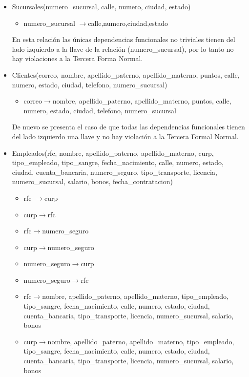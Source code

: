 \documentclass[11pt]{article}
\begin{document}
\begin{itemize}
\item Sucursales(numero\_sucursal, calle, numero, ciudad, estado)
      \begin{itemize}
        \item numero\_sucursal $\rightarrow$calle,numero,ciudad,estado
      \end{itemize}
      En esta relación las únicas dependencias funcionales no triviales tienen del lado izquierdo a la llave de la relación (numero\_sucursal), por lo tanto no hay violaciones a la Tercera Forma Normal.
\item Clientes(correo, nombre, apellido\_paterno, apellido\_materno, puntos, calle, numero, estado, ciudad, telefono, numero\_sucursal) 
      \begin{itemize}
        \item correo$\rightarrow$nombre, apellido\_paterno, apellido\_materno, puntos, calle, numero, estado, ciudad, telefono, numero\_sucursal
      \end{itemize}
      De nuevo se presenta el caso de que todas las dependencias funcionales tienen del lado izquierdo una llave y no hay violación a la Tercera Formal Normal.
\item Empleados(rfc, nombre, apellido\_paterno, apellido\_materno, curp,  tipo\_empleado, tipo\_sangre, fecha\_nacimiento, calle, numero, estado, ciudad, cuenta\_bancaria, numero\_seguro, tipo\_transporte, licencia, numero\_sucursal, salario, bonos, fecha\_contratacion)
      \begin{itemize}
        \item rfc $\rightarrow$curp
        \item curp$\rightarrow$rfc
        \item rfc$\rightarrow$numero\_seguro
        \item curp$\rightarrow$numero\_seguro
        \item numero\_seguro$\rightarrow$curp
        \item numero\_seguro$\rightarrow$rfc
        \item rfc$\rightarrow$nombre, apellido\_paterno, apellido\_materno, tipo\_empleado, tipo\_sangre, fecha\_nacimiento, calle, numero, estado, ciudad, cuenta\_bancaria, tipo\_transporte, licencia, numero\_sucursal, salario, bonos
        \item curp$\rightarrow$nombre, apellido\_paterno, apellido\_materno, tipo\_empleado, tipo\_sangre, fecha\_nacimiento, calle, numero, estado, ciudad, cuenta\_bancaria, tipo\_transporte, licencia, numero\_sucursal, salario, bonos

\end{itemize}
\end{itemize}
\end{document}
